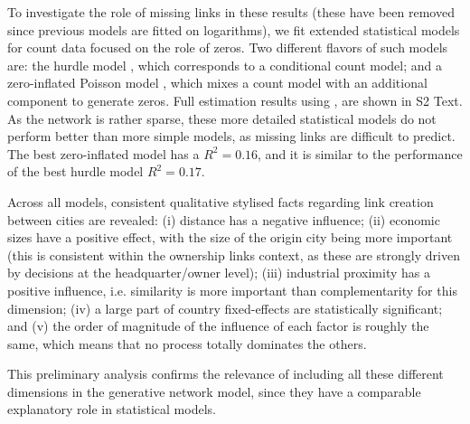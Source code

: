 \documentclass[10pt,letterpaper]{article}
\begin{document}
To investigate the role of missing links in these results (these have been removed since previous models are fitted on logarithms), we fit extended statistical models for count data focused on the role of zeros. Two different flavors of such models are: the hurdle model \cite{mullahy1986specification}, which corresponds to a conditional count model; and a zero-inflated Poisson model \cite{lambert1992zero}, which mixes a count model with an additional component to generate zeros. Full estimation results using \cite{zeileis2008regression}, are shown in S2 Text. As the network is rather sparse, these more detailed statistical models do not perform better than more simple models, as missing links are difficult to predict. The best zero-inflated model has a $R^2 = 0.16$, and it is similar to the performance of the best hurdle model $R^2 = 0.17$.


Across all models, consistent qualitative stylised facts regarding link creation between cities are revealed: (i) distance has a negative influence; (ii) economic sizes have a positive effect, with the size of the origin city being more important (this is consistent within the ownership links context, as these are strongly driven by decisions at the headquarter/owner level); (iii) industrial proximity has a positive influence, i.e. similarity is more important than complementarity for this dimension; (iv) a large part of country fixed-effects are statistically significant; and (v) the order of magnitude of the influence of each factor is roughly the same, which means that no process totally dominates the others.

This preliminary analysis confirms the relevance of including all these different dimensions in the generative network model, since they have a comparable explanatory role in statistical models.
\end{document}
